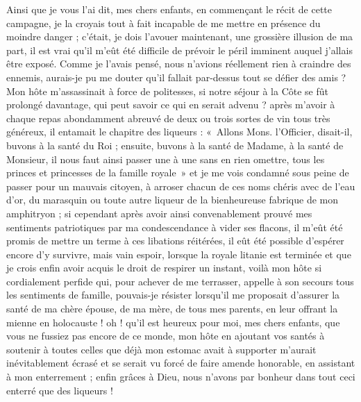 \documentclass[11pt,a4paper]{report}
\begin{document}
Ainsi que je vous l'ai dit, mes chers enfants, en commençant le récit de cette campagne, je la croyais tout à fait incapable de me mettre en présence du moindre danger ; c'était, je dois l'avouer maintenant, une grossière illusion de ma part, il est vrai qu'il m'eût été difficile de prévoir le péril imminent auquel j'allais être exposé. Comme je l'avais pensé, nous n'avions réellement rien à craindre des ennemis, aurais-je pu me douter qu'il fallait par-dessus tout se défier des amis ? Mon hôte m'assassinait à force de politesses, si notre séjour à la Côte se fût prolongé davantage, qui peut savoir ce qui en serait advenu ? après m'avoir à chaque repas abondamment abreuvé de deux ou trois sortes de vin tous très généreux, il entamait le chapitre des liqueurs : «~Allons Mons. l'Officier, disait-il, buvons à la santé du Roi ; ensuite, buvons à la santé de Madame, à la santé de Monsieur, il nous faut ainsi passer une à une sans en rien omettre, tous les princes et princesses de la famille royale~» et je me vois condamné sous peine de passer pour un mauvais citoyen, à arroser chacun de ces noms chéris avec de l'eau d'or, du marasquin ou toute autre liqueur de la bienheureuse fabrique de mon amphitryon ; si cependant après avoir ainsi convenablement prouvé mes sentiments patriotiques par ma condescendance à vider ses flacons, il m'eût été promis de mettre un terme à ces libations réitérées, il eût été possible d'espérer encore d'y survivre, mais vain espoir, lorsque la royale litanie est terminée et que je crois enfin avoir acquis le droit de respirer un instant, voilà mon hôte si cordialement perfide qui, pour achever de me terrasser, appelle à son secours tous les sentiments de famille, pouvais-je résister lorsqu'il me proposait d'assurer la santé de ma chère épouse, de ma mère, de tous mes parents, en leur offrant la mienne en holocauste ! oh ! qu'il est heureux pour moi, mes chers enfants, que vous ne fussiez pas encore de ce monde, mon hôte en ajoutant vos santés à soutenir à toutes celles que déjà mon estomac avait à supporter m'aurait inévitablement écrasé et se serait vu forcé de faire amende honorable, en assistant à mon enterrement ; enfin grâces à Dieu, nous n'avons par bonheur dans tout ceci enterré que des liqueurs !
\end{document}
